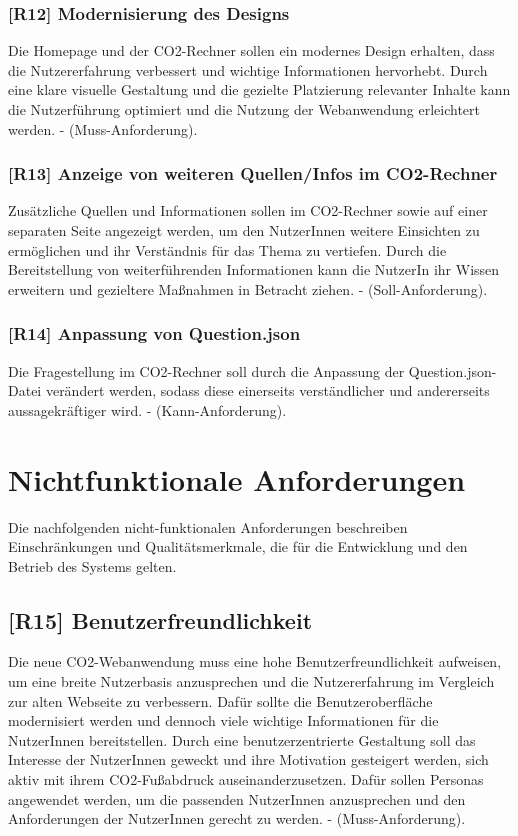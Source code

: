 \subsubsection{[R12] Modernisierung des Designs}

Die Homepage und der CO2-Rechner sollen ein modernes Design erhalten, dass die Nutzererfahrung verbessert und wichtige Informationen hervorhebt. Durch eine klare visuelle Gestaltung und die gezielte Platzierung relevanter Inhalte kann die Nutzerführung optimiert und die Nutzung der Webanwendung erleichtert werden. - (Muss-Anforderung).

\subsubsection{[R13] Anzeige von weiteren Quellen/Infos im CO2-Rechner}

Zusätzliche Quellen und Informationen sollen im CO2-Rechner sowie auf einer separaten Seite angezeigt werden, um den NutzerInnen weitere Einsichten zu ermöglichen und ihr Verständnis für das Thema zu vertiefen. Durch die Bereitstellung von weiterführenden Informationen kann die NutzerIn ihr Wissen erweitern und gezieltere Maßnahmen in Betracht ziehen. - (Soll-Anforderung).

\subsubsection{[R14] Anpassung von Question.json}
\label{sec:questions-json-anpassen}

Die Fragestellung im CO2-Rechner soll durch die Anpassung der Question.json-Datei verändert werden, sodass diese einerseits verständlicher und andererseits aussagekräftiger wird. - (Kann-Anforderung).

\section{Nichtfunktionale Anforderungen}
\label{chapter:5-section:nichtfunktionale-anforderungen}

Die nachfolgenden nicht-funktionalen Anforderungen beschreiben Einschränkungen und Qualitätsmerkmale, die für die Entwicklung und den Betrieb des Systems gelten.

\subsection{[R15] Benutzerfreundlichkeit}

Die neue CO2-Webanwendung muss eine hohe Benutzerfreundlichkeit aufweisen, um eine breite Nutzerbasis anzusprechen und die Nutzererfahrung im Vergleich zur alten Webseite zu verbessern. Dafür sollte die Benutzeroberfläche modernisiert werden und dennoch viele wichtige Informationen für die NutzerInnen bereitstellen. Durch eine benutzerzentrierte Gestaltung soll das Interesse der NutzerInnen geweckt und ihre Motivation gesteigert werden, sich aktiv mit ihrem CO2-Fußabdruck auseinanderzusetzen. Dafür sollen Personas angewendet werden, um die passenden NutzerInnen anzusprechen und den Anforderungen der NutzerInnen gerecht zu werden. - (Muss-Anforderung).


